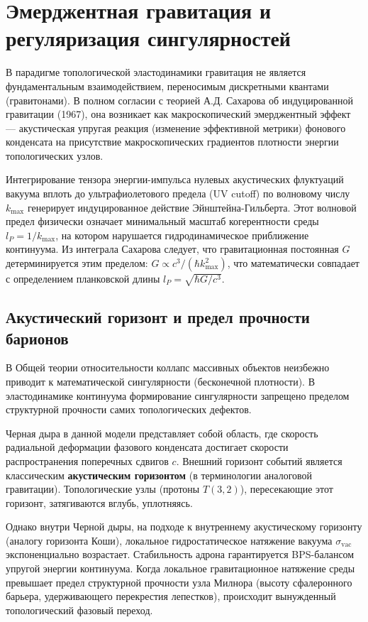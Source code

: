 \documentclass[12pt,a4paper]{article}
\begin{document}
	
		
	\section{Эмерджентная гравитация и регуляризация сингулярностей}
	
	В парадигме топологической эластодинамики гравитация не является фундаментальным взаимодействием, переносимым дискретными квантами (гравитонами). В полном согласии с теорией А.Д. Сахарова об индуцированной гравитации (1967), она возникает как макроскопический эмерджентный эффект — акустическая упругая реакция (изменение эффективной метрики) фонового конденсата на присутствие макроскопических градиентов плотности энергии топологических узлов.
	
	Интегрирование тензора энергии-импульса нулевых акустических флуктуаций вакуума вплоть до ультрафиолетового предела (UV cutoff) по волновому числу $k_{\text{max}}$ генерирует индуцированное действие Эйнштейна-Гильберта. Этот волновой предел физически означает минимальный масштаб когерентности среды $l_P = 1/k_{\text{max}}$, на котором нарушается гидродинамическое приближение континуума. Из интеграла Сахарова следует, что гравитационная постоянная $G$ детерминируется этим пределом: $G \propto c^3 / (\hbar k_{\text{max}}^2)$, что математически совпадает с определением планковской длины $l_P = \sqrt{\hbar G / c^3}$.
	
	\subsection{Акустический горизонт и предел прочности барионов}
	В Общей теории относительности коллапс массивных объектов неизбежно приводит к математической сингулярности (бесконечной плотности). В эластодинамике континуума формирование сингулярности запрещено пределом структурной прочности самих топологических дефектов.
	
	Черная дыра в данной модели представляет собой область, где скорость радиальной деформации фазового конденсата достигает скорости распространения поперечных сдвигов $c$. Внешний горизонт событий является классическим \textbf{акустическим горизонтом} (в терминологии аналоговой гравитации). Топологические узлы (протоны $T(3,2)$), пересекающие этот горизонт, затягиваются вглубь, уплотняясь.
	
	Однако внутри Черной дыры, на подходе к внутреннему акустическому горизонту (аналогу горизонта Коши), локальное гидростатическое натяжение вакуума $\sigma_{\text{vac}}$ экспоненциально возрастает. Стабильность адрона гарантируется BPS-балансом упругой энергии континуума. Когда локальное гравитационное натяжение среды превышает предел структурной прочности узла Милнора (высоту сфалеронного барьера, удерживающего перекрестия лепестков), происходит вынужденный топологический фазовый переход.
	
\end{document}

